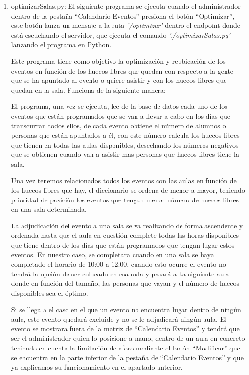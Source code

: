 \documentclass[a4paper, 12pt]{book}
\begin{document}
\begin{enumerate}
  	
  	\item optimizarSalas.py: El siguiente programa se ejecuta cuando el administrador dentro de la pestaña ``Calendario Eventos'' presiona el botón ``Optimizar'', este botón lanza un mensaje a la ruta \textit{'/optimizar'} dentro el endpoint donde está escuchando el servidor, que ejecuta el comando \textit{'./optimizarSalas.py'} lanzando el programa en Python. 
  	
  	Este programa tiene como objetivo la optimización y reubicación de los eventos en función de los huecos libres que quedan con respecto a la gente que se ha apuntado al evento o quiere asistir y con los huecos libres que quedan en la sala. Funciona de la siguiente manera:
  	
  	El programa, una vez se ejecuta, lee de la base de datos cada uno de los eventos que están programados que se van a llevar a cabo en los días que transcurran todos ellos, de cada evento obtiene el número de alumnos o personas que están apuntados a él, con este número calcula los huecos libres que tienen en todas las aulas disponibles, desechando los números negativos que se obtienen cuando van a asistir mas personas que huecos libres tiene la sala.
  	
  	Una vez tenemos relacionados todos los eventos con las aulas en función de los huecos libres que hay, el diccionario se ordena de menor a mayor, teniendo prioridad de posición los eventos que tengan menor número de huecos libres en una sala determinada.
  	 
  	La adjudicación del evento a una sala se va realizando de forma ascendente y ordenada hasta que el aula en cuestión complete todas las horas disponibles que tiene dentro de los días que están programados que tengan lugar estos eventos. En nuestro caso, se completara cuando en una sala se haya completado el horario de 10:00 a 12:00, cuando esto ocurre el evento no tendrá la opción de ser colocado en esa aula y pasará a ka siguiente aula donde en función del tamaño, las personas que vayan y el número de huecos disponibles sea el óptimo.
  	
  	Si se llega a el caso en el que un evento no encuentra lugar dentro de ningún aula, este evento quedará excluido y no se le adjudicará ningún aula. El evento se mostrara fuera de la matriz de ``Calendario Eventos''  y tendrá que ser el administrador quien lo posicione a mano, dentro de un aula en concreto teniendo en cuenta la limitación de aforo mediante el botón ``Modificar'' que se encuentra en la parte inferior de la pestaña de ``Calendario Eventos'' y que ya explicamos su funcionamiento en el apartado anterior.
	\end{enumerate}
\end{document}
